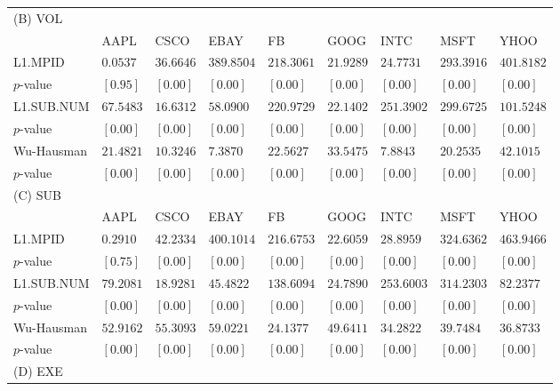\documentclass{article}
\begin{document}
\begin{table}[]
{\begin{tabular}{lllllllll}
(B) VOL               &           &            &            &            &           &            &            &            \\
 & AAPL                & CSCO  & EBAY  & FB    & GOOG  & INTC  & MSFT  & YHOO       \\
L1.MPID  & $0.0537$  & $36.6646$ & $389.8504$ & $218.3061$ & $21.9289$ & $24.7731$  & $293.3916$ & $401.8182$ \\
$p$-value                & $[0.95]$  & $[0.00]$  & $[0.00]$   & $[0.00]$   & $[0.00]$  & $[0.00]$   & $[0.00]$   & $[0.00]$   \\
L1.SUB.NUM            & $67.5483$ & $16.6312$ & $58.0900$  & $220.9729$ & $22.1402$ & $251.3902$ & $299.6725$ & $101.5248$ \\
$p$-value                & $[0.00]$  & $[0.00]$  & $[0.00]$   & $[0.00]$   & $[0.00]$  & $[0.00]$   & $[0.00]$   & $[0.00]$   \\
Wu-Hausman            & $21.4821$ & $10.3246$ & $7.3870$   & $22.5627$  & $33.5475$ & $7.8843$   & $20.2535$  & $42.1015$  \\
$p$-value                  & $[0.00]$  & $[0.00]$  & $[0.00]$   & $[0.00]$   & $[0.00]$  & $[0.00]$   & $[0.00]$   & $[0.00]$  \\
(C) SUB       &           &            &            &            &           &            &            &            \\
 & AAPL                & CSCO  & EBAY  & FB    & GOOG  & INTC  & MSFT  & YHOO       \\
L1.MPID & $0.2910$  & $42.2334$ & $400.1014$ & $216.6753$ & $22.6059$ & $28.8959$  & $324.6362$ & $463.9466$ \\
$p$-value                 & $[0.75]$  & $[0.00]$  & $[0.00]$   & $[0.00]$   & $[0.00]$  & $[0.00]$   & $[0.00]$   & $[0.00]$   \\
L1.SUB.NUM            & $79.2081$ & $18.9281$ & $45.4822$  & $138.6094$ & $24.7890$ & $253.6003$ & $314.2303$ & $82.2377$  \\
$p$-value                  & $[0.00]$  & $[0.00]$  & $[0.00]$   & $[0.00]$   & $[0.00]$  & $[0.00]$   & $[0.00]$   & $[0.00]$   \\
Wu-Hausman           & $52.9162$ & $55.3093$ & $59.0221$  & $24.1377$  & $49.6411$ & $34.2822$  & $39.7484$  & $36.8733$  \\
$p$-value                 & $[0.00]$  & $[0.00]$  & $[0.00]$   & $[0.00]$   & $[0.00]$  & $[0.00]$   & $[0.00]$   & $[0.00]$    \\
(D) EXE       &           &            &            &            &           &            &            &            \\

\end{tabular}}
\end{table}
\end{document}
